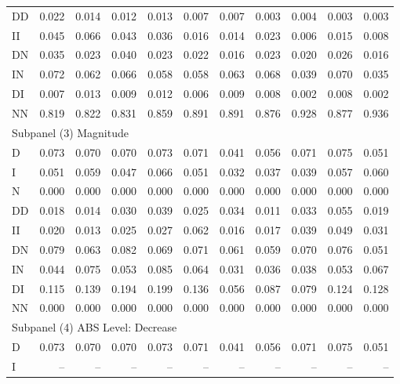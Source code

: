{\begin{tabular}{lrrrrrrrrrr}
DD     & 0.022 & 0.014 & 0.012 & 0.013 &  0.007 &  0.007 &  0.003 &  0.004 &  0.003 &  0.003 \\
II     & 0.045 & 0.066 & 0.043 & 0.036 &  0.016 &  0.014 &  0.023 &  0.006 &  0.015 &  0.008 \\
DN     & 0.035 & 0.023 & 0.040 & 0.023 &  0.022 &  0.016 &  0.023 &  0.020 &  0.026 &  0.016 \\
IN     & 0.072 & 0.062 & 0.066 & 0.058 &  0.058 &  0.063 &  0.068 &  0.039 &  0.070 &  0.035 \\
DI     & 0.007 & 0.013 & 0.009 & 0.012 &  0.006 &  0.009 &  0.008 &  0.002 &  0.008 &  0.002 \\
NN     & 0.819 & 0.822 & 0.831 & 0.859 &  0.891 &  0.891 &  0.876 &  0.928 &  0.877 &  0.936 \\ \hline
\multicolumn{11}{l}{Subpanel (3) Magnitude}                                                  \\ \hline
D      & 0.073 & 0.070 & 0.070 & 0.073 &  0.071 &  0.041 &  0.056 &  0.071 &  0.075 &  0.051 \\
I      & 0.051 & 0.059 & 0.047 & 0.066 &  0.051 &  0.032 &  0.037 &  0.039 &  0.057 &  0.060 \\
N      & 0.000 & 0.000 & 0.000 & 0.000 &  0.000 &  0.000 &  0.000 &  0.000 &  0.000 &  0.000 \\
DD     & 0.018 & 0.014 & 0.030 & 0.039 &  0.025 &  0.034 &  0.011 &  0.033 &  0.055 &  0.019 \\
II     & 0.020 & 0.013 & 0.025 & 0.027 &  0.062 &  0.016 &  0.017 &  0.039 &  0.049 &  0.031 \\
DN     & 0.079 & 0.063 & 0.082 & 0.069 &  0.071 &  0.061 &  0.059 &  0.070 &  0.076 &  0.051 \\
IN     & 0.044 & 0.075 & 0.053 & 0.085 &  0.064 &  0.031 &  0.036 &  0.038 &  0.053 &  0.067 \\
DI     & 0.115 & 0.139 & 0.194 & 0.199 &  0.136 &  0.056 &  0.087 &  0.079 &  0.124 &  0.128 \\
NN     & 0.000 & 0.000 & 0.000 & 0.000 &  0.000 &  0.000 &  0.000 &  0.000 &  0.000 &  0.000 \\ \hline
\multicolumn{11}{l}{Subpanel (4) ABS Level: Decrease}                                        \\ \hline
D      & 0.073 & 0.070 & 0.070 & 0.073 &  0.071 &  0.041 &  0.056 &  0.071 &  0.075 &  0.051 \\
I      &    -- &    -- &    -- &    -- &     -- &     -- &     -- &     -- &     -- &     -- \\

\end{tabular}}
